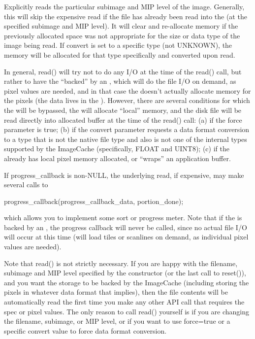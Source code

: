 
Explicitly reads the particular subimage and MIP level of the image.  Generally,
this will skip the expensive read if the file has already been read into
the \ImageBuf (at the specified subimage and MIP level).  It will clear
and re-allocate memory if the previously allocated space was not
appropriate for the size or data type of the image being read.
If {\cf convert} is set to a specific type (not {\cf UNKNOWN}), the
\ImageBuf memory will be allocated for that type specifically and
converted upon read.

In general, {\cf read()} will try not to do any I/O at the time of the
{\cf read()} call, but rather to have the \ImageBuf ``backed'' by an
\ImageCache, which will do the file I/O on demand, as pixel values are
needed, and in that case the \ImageBuf doesn't actually allocate memory
for the pixels (the data lives in the \ImageCache).  However, there are
several conditions for which the \ImageCache will be bypassed, the
\ImageBuf will allocate ``local'' memory, and the disk file will be read
directly into allocated buffer at the time of the {\cf read()} call:
(a) if the {\cf force} parameter is {\cf true}; (b) if the {\cf convert}
parameter requests a data format conversion to a type that is not the
native file type and also is not one of the internal types supported by
the {\cf ImageCache} (specifically, {\cf FLOAT} and {\cf UINT8});
(c) if the \ImageBuf already has local pixel memory allocated, or
``wraps'' an application buffer.

If {\cf progress_callback} is non-NULL, the underlying read, if
expensive, may make several calls to
\begin{code}
  progress_callback(progress_callback_data, portion_done);
\end{code}
\noindent which allows you to implement some sort or progress meter.
Note that if the \ImageBuf is backed by an \ImageCache, the
progress callback will never be called, since no actual file I/O
will occur at this time (\ImageCache will load tiles or scanlines
on demand, as individual pixel values are needed).

Note that {\cf read()} is not strictly necessary. If you are happy with
the filename, subimage and MIP level specified by the \ImageBuf constructor
(or the last call to {\cf reset()}), and you want the storage to be backed
by the {\cf ImageCache} (including storing the pixels in whatever data
format that implies), then the file contents will be automatically read
the first time you make any other \ImageBuf API call that requires the
spec or pixel values.  The only reason to call {\cf read()} yourself is
if you are changing the filename, subimage, or MIP level, or if you want
to use {\cf force=true} or a specific {\cf convert} value to force data
format conversion.
\apiend

